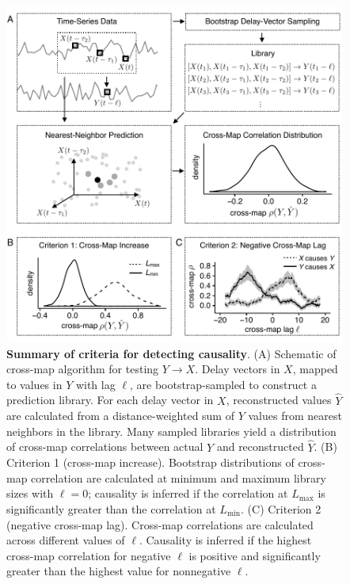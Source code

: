 \begin{figure}
    \begin{center}
        \includegraphics[width=6in]{dataflow/out/fig_conceptual/fig_conceptual.pdf}
    \end{center}
    \caption{\textbf{Summary of criteria for detecting causality}. (A) Schematic of cross-map algorithm for testing $Y \rightarrow X$. Delay vectors in $X$, mapped to values in $Y$ with lag $\ell$, are bootstrap-sampled to construct a prediction library. For each delay vector in $X$, reconstructed values $\hat{Y}$ are calculated from a distance-weighted sum of $Y$ values from nearest neighbors in the library. Many sampled libraries yield a distribution of cross-map correlations between actual $Y$ and reconstructed $\hat{Y}$. (B) Criterion 1 (cross-map increase). Bootstrap distributions of cross-map correlation are calculated at minimum and maximum library sizes with $\ell = 0$; causality is inferred if the correlation at $L_{\max}$ is significantly greater than the correlation at $L_{\min}$. (C) Criterion 2 (negative cross-map lag). Cross-map correlations are calculated across different values of $\ell$. Causality is inferred if the highest cross-map correlation for negative $\ell$ is positive and significantly greater than the highest value for nonnegative $\ell$. \label{fig:conceptual}}
\end{figure}

